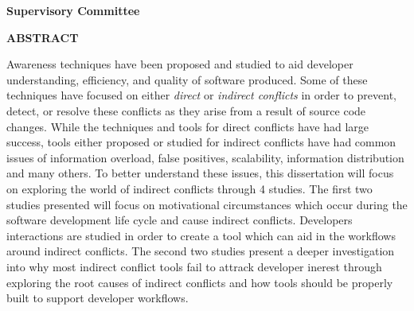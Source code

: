 \newpage
{}

\noindent \textbf{Supervisory Committee}
\tpbreak
\panel

\begin{center}
\textbf{ABSTRACT}
\end{center}

Awareness techniques have been proposed and studied to aid developer
understanding, efficiency, and quality of software produced. Some of these techniques have focused 
on either \textit{direct} or 
\textit{indirect conflicts} in order to prevent, detect, or resolve these conflicts as they arise
from a result of source code changes. While the techniques and tools for direct conflicts have had
large success, tools either proposed or studied for indirect conflicts have had common issues of
information overload, false positives, scalability, information distribution and many others. 
To better understand these issues, this dissertation will focus on exploring the world of indirect conflicts
through 4 studies. The first two studies presented will focus on motivational circumstances which occur
during the software development life cycle and cause indirect conflicts. Developers interactions are
studied in order to create a tool which can aid in the workflows around indirect conflicts. The second
two studies present a deeper investigation into why most indirect conflict tools fail to attrack developer
inerest through exploring the root causes of indirect conflicts and how tools should be properly built
to support developer workflows.
